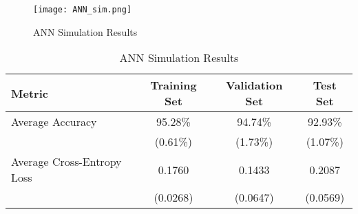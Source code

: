   \begin{figure}[h]
		\centering
		\texttt{[image: ANN\_sim.png]}
		\caption{ANN Simulation Results}
        \label{fig:ann_sim}
  \end{figure}

  \begin{table}[h]
    \centering
      \begin{tabular}{|l||c|c|c|}
      \hline
      \textbf{Metric} & \textbf{Training Set} & \textbf{Validation Set} & 
      \textbf{Test Set}\\
      \hline\hline
      Average Accuracy & 95.28\% & 94.74\% & 92.93\% \\\hline 
                       & (0.61\%) & (1.73\%) & (1.07\%) \\\hline
      Average Cross-Entropy Loss & 0.1760 & 0.1433 & 0.2087 \\\hline
                                 & (0.0268) & (0.0647) & (0.0569) \\
      \hline
    \end{tabular}
    \caption{ANN Simulation Results}
    \label{table:ann_sim}
  \end{table}

